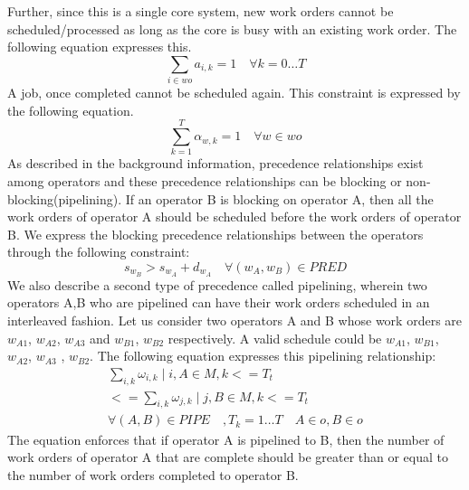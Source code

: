 \documentclass[20pt]{sigchi}
\begin{document}
Further, since this is a single core system, new work orders cannot be scheduled/processed as  long as the core is busy with an existing work order.  The following equation expresses this. 
\begin{equation}
\sum\limits_{i \in wo} a_{i,k} =1\hspace{1em}\forall k = 0 \hdots  T
\end{equation}
A job, once completed cannot be scheduled again. This constraint is expressed by the following equation.
\begin{equation}
\sum\limits_{k=1}^{T} \alpha_{w,k}  =1\hspace{1em}\forall w \in wo
\end{equation}
As described in the background information, precedence relationships exist among operators and these precedence relationships can be blocking or non-blocking(pipelining). 
If  an operator B is blocking on operator A, then all the work orders of operator A should be scheduled before the work orders of operator B.
We express the blocking  precedence relationships between the operators through the following constraint:
\begin{equation}
\label{eqn:5}
s_{w_{B}} > s_{w_{A}} + d_{w_{A}}\hspace{1em} \forall (w_{A},w_{B}) \in PRED
\end{equation} 
We also describe a second type of precedence called pipelining, wherein two operators A,B who are pipelined  can have their work orders scheduled in an interleaved fashion.
Let us consider two operators A and B whose work orders are  $w_{A1}$, $w_{A2}$, $w_{A3}$ and $w_{B1}$, $w_{B2}$ 
respectively.  A valid schedule could be  $w_{A1}$, $w_{B1}$, $w_{A2}$, $w_{A3}$ , $w_{B2}$. 
The following  equation expresses this pipelining relationship:
\begin{multline}
\label{eqn:6}
\sum\limits_{i,k}\omega_{i,k} \mid i,A \in M , k <=T_{t}
\\<= \sum\limits_{i,k}\omega_{j,k} \mid j,B \in M, k <=T_{t}  \\ \forall (A,B) \in PIPE  \hspace{1em} , T_{k}= 1 \hdots T \hspace{1em}
A \in o, B \in o
\end{multline}
The equation enforces that  if operator A is pipelined to B, then the number of work orders  of operator A that are complete should be greater than or equal to the number of work orders completed to operator B.
\end{document}
